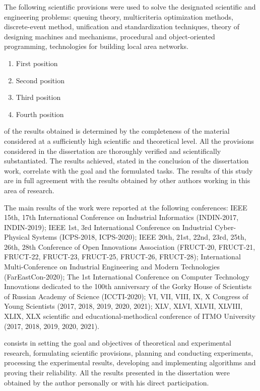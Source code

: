 {\methodsEn} The following scientific provisions were used to solve the designated scientific and engineering problems: queuing theory, multicriteria optimization methods, discrete-event method, unification and standardization techniques, theory of designing machines and mechanisms, procedural and object-oriented programming, technologies for building local area networks.

{}
\begin{enumerate}[beginpenalty=10000] %
	\item First position
	\item Second position
	\item Third position
	\item Fourth position
\end{enumerate}

{\reliabilityEn} of the results obtained is determined by the completeness of the material considered at a sufficiently high scientific and theoretical level. All the provisions considered in the dissertation are thoroughly verified and scientifically substantiated. The results achieved, stated in the conclusion of the dissertation work, correlate with the goal and the formulated tasks. The results of this study are in full agreement with the results obtained by other authors working in this area of research.


{\probationEn}
The main results of the work were reported at the following conferences: IEEE 15th, 17th International Conference on Industrial Informatics (INDIN-2017, INDIN-2019); IEEE 1st, 3rd International Conference on Industrial Cyber-Physical Systems (ICPS-2018, ICPS-2020); IEEE 20th, 21st, 22nd, 23rd, 25th, 26th, 28th Conference of Open Innovations Association (FRUCT-20, FRUCT-21, FRUCT-22, FRUCT-23, FRUCT-25, FRUCT-26, FRUCT-28); International Multi-Conference on Industrial Engineering and Modern Technologies (FarEastCon-2020); The 1st International Conference on Computer Technology Innovations dedicated to the 100th anniversary of the Gorky House of Scientists of Russian Academy of Science (ICCTI-2020); VI, VII, VIII, IX, X  Congress of Young Scientists (2017, 2018, 2019, 2020, 2021); XLV, XLVI, XLVII, XLVIII, XLIX, XLX  scientific and educational-methodical conference of {ITMO} University (2017, 2018, 2019, 2020, 2021).


{\contributionEn} consists in setting the goal and objectives of theoretical and experimental research, formulating scientific provisions, planning and conducting experiments, processing the experimental results, developing and implementing algorithms and proving their reliability. All the results presented in the dissertation were obtained by the author personally or with his direct participation.

